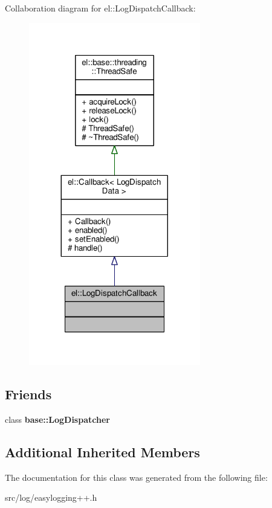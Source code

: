 Collaboration diagram for el\+:\+:Log\+Dispatch\+Callback\+:
\nopagebreak
\begin{figure}[H]
\begin{center}
\leavevmode
\includegraphics[width=212pt]{d3/dfa/classel_1_1LogDispatchCallback__coll__graph}
\end{center}
\end{figure}
\subsection*{Friends}
\begin{DoxyCompactItemize}
\item 
class {\bfseries base\+::\+Log\+Dispatcher}\hypertarget{classel_1_1LogDispatchCallback_a84d22f9ad5b796e49ff5f15a8c32773d}{}\label{classel_1_1LogDispatchCallback_a84d22f9ad5b796e49ff5f15a8c32773d}

\end{DoxyCompactItemize}
\subsection*{Additional Inherited Members}


The documentation for this class was generated from the following file\+:\begin{DoxyCompactItemize}
\item 
src/log/easylogging++.\+h\end{DoxyCompactItemize}
